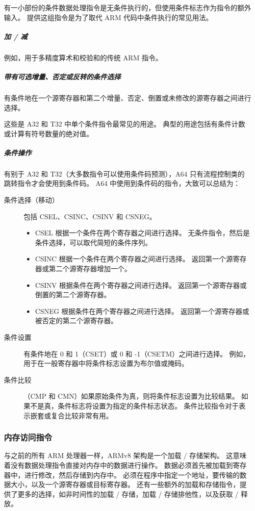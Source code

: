 有一小部份的条件数据处理指令是无条件执行的，但使用条件标志作为指令的额外输入。
提供这组指令是为了取代 ARM 代码中条件执行的常见用法。

\subparagraph*{加 / 减}

例如，用于多精度算术和校验和的传统 ARM 指令。

\subparagraph*{带有可选增量、否定或反转的条件选择}

有条件地在一个源寄存器和第二个增量、否定、倒置或未修改的源寄存器之间进行选择。

这些是 A32 和 T32 中单个条件指令最常见的用途。
典型的用途包括有条件计数或计算有符号数量的绝对值。

\subparagraph*{条件操作}

有别于 A32 和 T32（大多数指令可以使用条件码预测），A64 只有流程控制类的跳转指令才会使用到条件码。
A64 中使用到条件码的指令，大致可以总结为：

\begin{description}
  \item[条件选择（移动）] 包括 CSEL、CSINC、CSINV 和 CSNEG。
    \begin{itemize}
      \item CSEL 根据一个条件在两个寄存器之间进行选择。
        无条件指令，然后是条件选择，可以取代简短的条件序列。
      \item CSINC 根据一个条件在两个寄存器之间进行选择。
        返回第一个源寄存器或第二个源寄存器增加一个。
      \item CSINV 根据条件在两个寄存器之间进行选择。
        返回第一个源寄存器或倒置的第二个源寄存器。
      \item CSNEG 根据条件在两个寄存器之间进行选择。
        返回第一个源寄存器或被否定的第二个源寄存器。
    \end{itemize}
  \item[条件设置] 有条件地在 0 和 1（CSET）或 0 和 -1（CSETM）之间进行选择。
    例如，用于在一般寄存器中将条件标志设置为布尔值或掩码。
  \item[条件比较]（CMP 和 CMN）如果原始条件为真，则将条件标志设置为比较结果。
    如果不是真，条件标志将设置为指定的条件标志状态。
    条件比较指令对于表示嵌套或复合比较非常有用。
\end{description}

\subsubsection{内存访问指令}

与之前的所有 ARM 处理器一样，ARMv8 架构是一个加载 / 存储架构。
这意味着没有数据处理指令直接对内存中的数据进行操作。
数据必须首先被加载到寄存器中，进行修改，然后存储到内存中。
必须在程序中指定一个地址，要传输的数据大小，以及一个源寄存器或目标寄存器。
还有一些额外的加载和存储指令，提供了更多的选择，如非时间性的加载 / 存储，加载 / 存储排他性，以及获取 / 释放。


